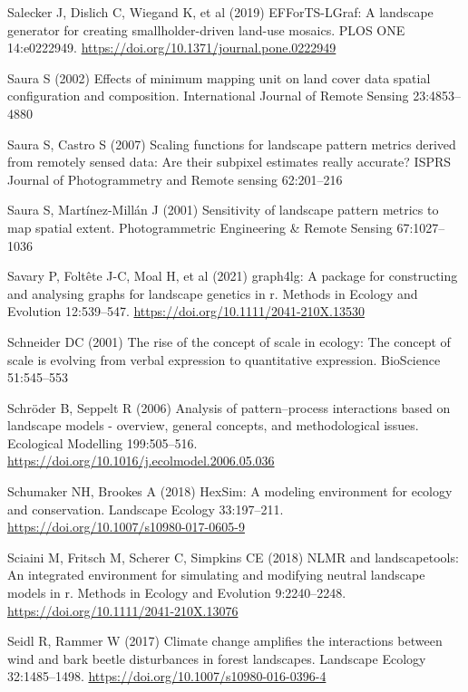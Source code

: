 \documentclass[
  10pt,
  a4paperpaper,
]{article}
\newlength{\cslhangindent}
\newenvironment{CSLReferences}[2] %
 {\begin{list}{}{%
  \setlength{\itemindent}{0pt}
  \setlength{\leftmargin}{0pt}
  \setlength{\parsep}{0pt}
  \ifodd #1
   \setlength{\leftmargin}{\cslhangindent}
   \setlength{\itemindent}{-1\cslhangindent}
  \fi
  \setlength{\itemsep}{#2\baselineskip}}}
 {\end{list}}
\begin{document}
\begin{CSLReferences}{1}{1}
Salecker J, Dislich C, Wiegand K, et al (2019) EFForTS-LGraf: A
landscape generator for creating smallholder-driven land-use mosaics.
PLOS ONE 14:e0222949. \url{https://doi.org/10.1371/journal.pone.0222949}

Saura S (2002) Effects of minimum mapping unit on land cover data
spatial configuration and composition. International Journal of Remote
Sensing 23:4853--4880

Saura S, Castro S (2007) Scaling functions for landscape pattern metrics
derived from remotely sensed data: Are their subpixel estimates really
accurate? ISPRS Journal of Photogrammetry and Remote sensing 62:201--216

Saura S, Martínez-Millán J (2001) Sensitivity of landscape pattern
metrics to map spatial extent. Photogrammetric Engineering \& Remote
Sensing 67:1027--1036

Savary P, Foltête J-C, Moal H, et al (2021) graph4lg: A package for
constructing and analysing graphs for landscape genetics in r. Methods
in Ecology and Evolution 12:539--547.
\url{https://doi.org/10.1111/2041-210X.13530}

Schneider DC (2001) The rise of the concept of scale in ecology: The
concept of scale is evolving from verbal expression to quantitative
expression. BioScience 51:545--553

Schröder B, Seppelt R (2006) Analysis of pattern--process interactions
based on landscape models - overview, general concepts, and
methodological issues. Ecological Modelling 199:505--516.
\url{https://doi.org/10.1016/j.ecolmodel.2006.05.036}

Schumaker NH, Brookes A (2018) HexSim: A modeling environment for
ecology and conservation. Landscape Ecology 33:197--211.
\url{https://doi.org/10.1007/s10980-017-0605-9}

Sciaini M, Fritsch M, Scherer C, Simpkins CE (2018) NLMR and
landscapetools: An integrated environment for simulating and modifying
neutral landscape models in r. Methods in Ecology and Evolution
9:2240--2248. \url{https://doi.org/10.1111/2041-210X.13076}

Seidl R, Rammer W (2017) Climate change amplifies the interactions
between wind and bark beetle disturbances in forest landscapes.
Landscape Ecology 32:1485--1498.
\url{https://doi.org/10.1007/s10980-016-0396-4}


\end{CSLReferences}
\end{document}
